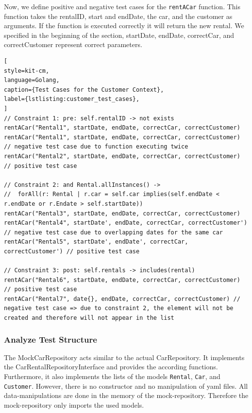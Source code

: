 Now, we define positive and negative test cases for the \texttt{rentACar\(\)} function.
This function takes the rentalID, start and endDate, the car, and the customer as arguments.
If the function is executed correctly it will return the new rental.
We specified in the beginning of the section, startDate, endDate, correctCar, and correctCustomer represent correct parameters.

\begin{lstlisting}[
style=kit-cm,
language=Golang,
caption={Test Cases for the Customer Context},
label={lstlisting:customer_test_cases},
]
// Constraint 1: pre: self.rentalID -> not exists
rentACar("Rental1", startDate, endDate, correctCar, correctCustomer)
rentACar("Rental1", startDate, endDate, correctCar, correctCustomer) // negative test case due to function executing twice
rentACar("Rental2", startDate, endDate, correctCar, correctCustomer) // positive test case

// Constraint 2: and Rental.allInstances() -> 
//  forAll(r: Rental | r.car = self.car implies(self.endDate < r.endDate or r.Endate > self.startDate))
rentACar("Rental3", startDate, endDate, correctCar, correctCustomer)
rentACar("Rental4", startDate', endDate, correctCar, correctCustomer') // negative test case due to overlapping dates for the same car
rentACar("Rental5", startDate', endDate', correctCar, correctCustomer') // positive test case 

// Constraint 3: post: self.rentals -> includes(rental)
rentACar("Rental6", startDate, endDate, correctCar, correctCustomer) // positive test case
rentACar("Rental7", date{}, endDate, correctCar, correctCustomer) // negative test case => due to constraint 2, the element will not be created and therefore will not appear in the list

\end{lstlisting}

\subsubsection*{Analyze Test Structure}
The MockCarRepository acts similar to the actual CarRepository.
It implements the CarRentalRepositoryInterface and provides the according functions.
Furthermore, it also implements the lists of the models \texttt{Rental}, \texttt{Car}, and \texttt{Customer}.
However, there is no constructor and no manipulation of yaml files.
All data-manipulations are done in the memory of the mock-repository.
Therefore the mock-repository only imports the used models.

